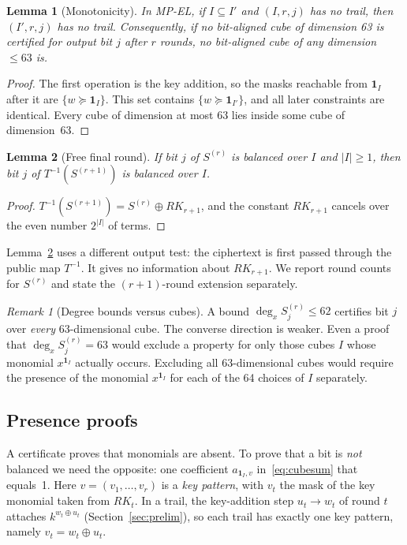\documentclass[11pt,a4paper]{article}
\newtheorem{lemma}{Lemma}
\theoremstyle{definition}
\theoremstyle{remark}
\newtheorem{remark}{Remark}
\newcommand{\MPEL}{\textsf{MP-EL}}
\begin{document}
\begin{lemma}[Monotonicity]\label{lem:mono}
In \MPEL, if $I\subseteq I'$ and $(I,r,j)$ has no trail, then $(I',r,j)$ has no trail. Consequently, if no bit-aligned cube of dimension 63 is certified for output bit $j$ after $r$ rounds, no bit-aligned cube of any dimension $\le63$ is.
\end{lemma}
\begin{proof}
The first operation is the key addition, so the masks reachable from $\mathbf 1_I$ after it are $\{w\succeq\mathbf 1_I\}$. This set contains $\{w\succeq\mathbf 1_{I'}\}$, and all later constraints are identical. Every cube of dimension at most 63 lies inside some cube of dimension~63.
\end{proof}

\begin{lemma}[Free final round]\label{lem:free}
If bit $j$ of $S^{(r)}$ is balanced over $I$ and $|I|\ge1$, then bit $j$ of $T^{-1}(S^{(r+1)})$ is balanced over $I$.
\end{lemma}
\begin{proof}
$T^{-1}(S^{(r+1)})=S^{(r)}\oplus RK_{r+1}$, and the constant $RK_{r+1}$ cancels over the even number $2^{|I|}$ of terms.
\end{proof}
Lemma~\ref{lem:free} uses a different output test: the ciphertext is first passed through the public map $T^{-1}$. It gives no information about $RK_{r+1}$. We report round counts for $S^{(r)}$ and state the $(r{+}1)$-round extension separately.

\begin{remark}[Degree bounds versus cubes]\label{rem:percube}
A bound $\deg_x S^{(r)}_j\le62$ certifies bit $j$ over \emph{every} 63-dimensional cube. The converse direction is weaker. Even a proof that $\deg_x S^{(r)}_j=63$ would exclude a property for only those cubes $I$ whose monomial $x^{\mathbf 1_I}$ actually occurs. Excluding all 63-dimensional cubes would require the presence of the monomial $x^{\mathbf 1_{I}}$ for each of the 64 choices of $I$ separately.
\end{remark}

\subsection{Presence proofs}\label{sec:presence}
A certificate proves that monomials are absent. To prove that a bit is \emph{not} balanced we need the opposite: one coefficient $a_{\mathbf 1_I,v}$ in~\eqref{eq:cubesum} that equals~1. Here $v=(v_1,\dots,v_r)$ is a \emph{key pattern}, with $v_t$ the mask of the key monomial taken from $RK_t$. In a trail, the key-addition step $u_t\to w_t$ of round $t$ attaches $k^{w_t\oplus u_t}$ (Section~\ref{sec:prelim}), so each trail has exactly one key pattern, namely $v_t=w_t\oplus u_t$.
\end{document}
